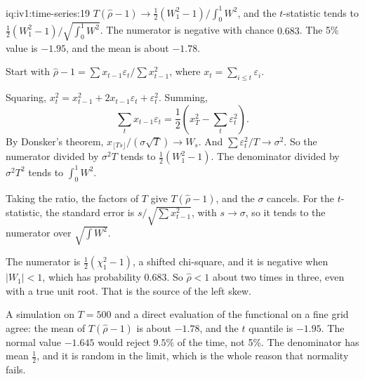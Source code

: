 \begin{solution}{iq:iv1:time-series:19}
$T(\hat{\rho} - 1) \to \frac12(W_1^2 - 1)/\int_0^1W^2$, and the $t$-statistic tends to $\frac12(W_1^2 - 1)/\sqrt{\int_0^1W^2}$. The numerator is negative with chance $0.683$. The 5\% value is $-1.95$, and the mean is about $-1.78$.

Start with $\hat{\rho} - 1 = \sum x_{t - 1}\varepsilon_t/\sum x_{t - 1}^2$, where $x_t = \sum_{i \le t}\varepsilon_i$.

Squaring, $x_t^2 = x_{t - 1}^2 + 2x_{t - 1}\varepsilon_t + \varepsilon_t^2$. Summing,
\[
\sum_tx_{t - 1}\varepsilon_t = \frac12\left(x_T^2 - \sum_t\varepsilon_t^2\right).
\]
By Donsker's theorem, $x_{\lfloor Ts\rfloor}/(\sigma\sqrt{T}) \to W_s$. And $\sum\varepsilon_t^2/T \to \sigma^2$. So the numerator divided by $\sigma^2T$ tends to $\frac12(W_1^2 - 1)$. The denominator divided by $\sigma^2T^2$ tends to $\int_0^1W^2$.

Taking the ratio, the factors of $T$ give $T(\hat{\rho} - 1)$, and the $\sigma$ cancels. For the $t$-statistic, the standard error is $s/\sqrt{\sum x_{t - 1}^2}$, with $s \to \sigma$, so it tends to the numerator over $\sqrt{\int W^2}$.

The numerator is $\frac12(\chi_1^2 - 1)$, a shifted chi-square, and it is negative when $|W_1| < 1$, which has probability $0.683$. So $\hat{\rho} < 1$ about two times in three, even with a true unit root. That is the source of the left skew.

A simulation on $T = 500$ and a direct evaluation of the functional on a fine grid agree: the mean of $T(\hat{\rho} - 1)$ is about $-1.78$, and the $t$ quantile is $-1.95$. The normal value $-1.645$ would reject $9.5\%$ of the time, not 5\%. The denominator has mean $\frac12$, and it is random in the limit, which is the whole reason that normality fails.



\end{solution}

